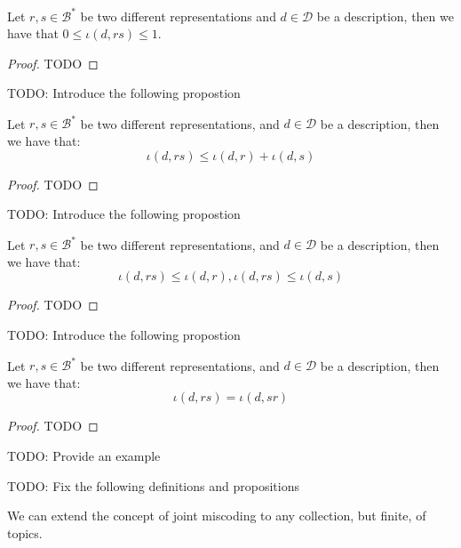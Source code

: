 \begin{proposition}
Let $r, s \in \mathcal{B}^\ast$ be two different representations and $d \in \mathcal{D}$ be a description, then we have that $0 \leq \iota(d, rs) \leq 1$.
\end{proposition}
\begin{proof}
{\color{red} TODO}
\end{proof}

{\color{red} TODO: Introduce the following propostion}

\begin{proposition}
Let $r, s \in \mathcal{B}^\ast$ be two different representations, and $d \in \mathcal{D}$ be a description, then we have that:
\[
\iota(d, rs) \leq \iota(d, r) + \iota(d, s)
\]
\end{proposition}
\begin{proof}
{\color{red} TODO}
\end{proof}

{\color{red} TODO: Introduce the following propostion}

\begin{proposition}
Let $r, s \in \mathcal{B}^\ast$ be two different representations, and $d \in \mathcal{D}$ be a description, then we have that:
\[
\iota(d, rs) \leq \iota(d, r), \iota(d, rs) \leq \iota(d, s)
\]
\end{proposition}
\begin{proof}
{\color{red} TODO}
\end{proof}


{\color{red} TODO: Introduce the following propostion}

\begin{proposition}
Let $r, s \in \mathcal{B}^\ast$ be two different representations, and $d \in \mathcal{D}$ be a description, then we have that:
\[
\iota(d, rs) = \iota(d, sr)
\]
\end{proposition}
\begin{proof}
{\color{red} TODO}
\end{proof}

\begin{example}
\label{ex:inaccuracy_joint_inequality}
{\color{red} TODO: Provide an example}
\end{example}

{\color{red} TODO: Fix the following definitions and propositions}

We can extend the concept of joint miscoding to any collection, but finite, of topics.

